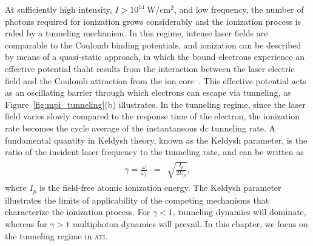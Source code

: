 At sufficiently high intensity, $I > 10^{14}\ \mathrm{W/cm^2}$, and
low frequency, the number of photons required for ionization grows
considerably and the ionization process is ruled by a tunneling
mechanism. In this regime, intense laser fields are comparable to the
Coulomb binding potentials, and ionization can be described by means
of a quasi-static approach, in which the bound electrons experience an
effective potential thaht results from the interaction between the
laser electric field and the Coulomb attraction from the ion
core~\cite{KeldyshSFA}. This effective potential acts as an
oscillating barrier through which electrons can escape via tunneling,
as Figure~\ref{fig:mpi_tunneling}(b) illustrates. In the tunneling
regime, since the laser field varies slowly compared to the response
time of the electron, the ionization rate becomes the cycle average of
the instantaneous dc tunneling rate. A fundamental quantity in Keldysh
theory, known as the Keldysh parameter, is the ratio of the incident
laser frequency to the tunneling rate, and can be written
as~\cite{KeldyshSFA}
%
\begin{eqnarray}
\begin{split}
\gamma = \frac{\omega}{\omega_{t}} & = & \sqrt{\frac{I_{p}}{2 U_{p}}},
\end{split}
\end{eqnarray}
%
where $I_{p}$ is the field-free atomic ionization energy. The Keldysh
parameter illustrates the limits of applicability of the competing
mechanisms that characterize the ionization process. For $\gamma < 1$,
tunneling dynamics will dominate, whereas for $\gamma > 1$ multiphoton
dynamics will prevail. In this chapter, we focus on the tunneling
regime in \textsc{ati}.

